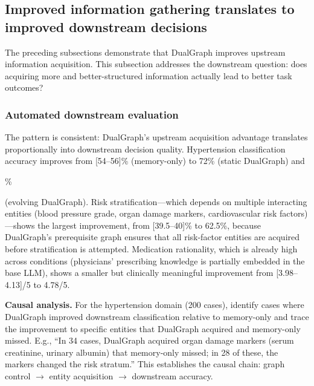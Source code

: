 \documentclass[11pt,a4paper]{article}
\newcommand{\placeholder}[1]{%
  \begin{tcolorbox}[colback=yellow!10,colframe=orange!60!black,
    fonttitle=\bfseries,title=Placeholder]
    #1
  \end{tcolorbox}%
}
\begin{document}
\subsection{Improved information gathering translates to improved downstream
decisions}
\label{sec:results_downstream}

The preceding subsections demonstrate that DualGraph improves upstream
information acquisition. This subsection addresses the downstream question:
does acquiring more and better-structured information actually lead to better
task outcomes?

\subsubsection{Automated downstream evaluation}

\begin{table}[!htbp]
\centering
\caption{Downstream task performance across domains. Clinical domains:
diagnosis accuracy, risk stratification accuracy, medication rationality
(1--5), follow-up protocol score (1--5). Non-medical domains:
domain-specific decision metrics. DualGraph (evolving) uses the
evolving-DAG variant. [N] cases per domain.}
\label{tab:downstream}
\small

\end{table}

The pattern is consistent: DualGraph's upstream acquisition advantage
translates proportionally into downstream decision quality. Hypertension
classification accuracy improves from [54--56]\% (memory-only) to 72\%
(static DualGraph) and \placeholder{[X]\%} (evolving DualGraph).
Risk stratification---which depends on multiple interacting entities
(blood pressure grade, organ damage markers, cardiovascular risk
factors)---shows the largest improvement, from [39.5--40]\% to 62.5\%,
because DualGraph's prerequisite graph ensures that all risk-factor
entities are acquired before stratification is attempted. Medication
rationality, which is already high across conditions (physicians' prescribing
knowledge is partially embedded in the base LLM), shows a smaller but
clinically meaningful improvement from [3.98--4.13]/5 to 4.78/5.

\placeholder{%
  \textbf{Causal analysis.} For the hypertension domain (200 cases),
  identify cases where DualGraph improved downstream classification
  relative to memory-only and trace the improvement to specific entities
  that DualGraph acquired and memory-only missed. E.g., ``In 34 cases,
  DualGraph acquired organ damage markers (serum creatinine, urinary
  albumin) that memory-only missed; in 28 of these, the markers changed
  the risk stratum.'' This establishes the causal chain: graph control
  $\to$ entity acquisition $\to$ downstream accuracy.
}
\end{document}
